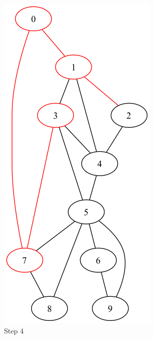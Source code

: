 \documentclass[a4paper,11pt]{report}
\begin{document}
\begin{figure}[htbp]
    \begin{subfigure}[b]{0.3\textwidth}
        \includegraphics[height=0.29\textheight]{notebook/assets/aufgabe_07_fleury_step_3.png}
        \caption{Step 4}
        \label{fig:fleury_step_4}
    \end{subfigure}
    \hfill
    \begin{subfigure}[b]{0.3\textwidth}

\end{subfigure}
\end{figure}
\end{document}
